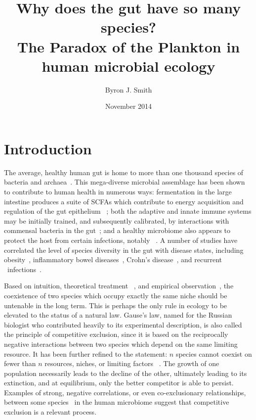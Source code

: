 \documentclass[12pt]{article}
\begin{document}
\title{\huge Why does the gut have so many species? \\
       {\Large The Paradox of the Plankton in human microbial ecology}}
\author{Byron J. Smith}
\date{November 2014}
\maketitle

\section{Introduction}
The average, healthy human gut is home to more than one thousand species of
bacteria and archaea~\citep{Claesson2009,Brestoff2013}.
This mega-diverse microbial assemblage has been shown to contribute to human
health in numerous ways:
fermentation in the large intestine produces a suite of \glspl*{SCFA}
which contribute to energy acquisition and regulation of the gut epithelium~%
\citep{Macfarlane2012};
both the adaptive and innate immune systems may be initially trained,
and subsequently calibrated,
by interactions with commensal bacteria in the gut~\citep{Brestoff2013};
and a healthy microbiome also appears to protect the host from certain
infections, notably \cdiff~\citep{Britton2012}.
A number of studies have correlated the level of species diversity in the gut
with disease states,
including obesity~\citep{Turnbaugh2008,LeChatelier2013},
inflammatory bowel diseases~\citep{Dicksved2008},
Crohn's disease~\citep{Manichanh2006},
and recurrent \cdiff\ infections~\citep{Chang2008}.

Based on intuition, theoretical treatment%
~\citep{Lotka1925,Volterra1928,MacArthur1967a},
and empirical observation~\citep{Gause1932,Gause1936},
the coexistence of two species which occupy
exactly the same niche should be untenable in the long term.
This is perhaps the only rule in ecology to be elevated to the
status of a natural law.
Gause's law, named for the Russian biologist who contributed
heavily to its experimental description, is also called
the principle of competitive exclusion, since it is based on
the reciprocally negative interactions between two species which
depend on the same limiting resource.
It has been further refined to the statement: \(n\) species cannot coexist on
fewer than \(n\) resources, niches, or limiting factors%
~\citep[various authors, for a review see][]{Armstrong1980}.
The growth of one population necessarily leads to the decline of
the other, ultimately leading to its extinction,
and at equilibrium, only the better competitor is able to persist.
Examples of strong, negative correlations,
or even co-exclusionary relationships,
between some species~\citep{Faust2012a} in the human microbiome
suggest that competitive exclusion is a relevant process.
\end{document}

